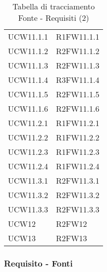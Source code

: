 \begin{table}[!htbp]
\begin{tabular}[t]{ m{}<{\centering}  m{}<{\centering} }
	UCW11.1.1 & R1FW11.1.1 \\
		
	UCW11.1.2 & R2FW11.1.2 \\
		
	UCW11.1.3 & R2FW11.1.3 \\
	
	UCW11.1.4 & R3FW11.1.4\\
	
	UCW11.1.5 & R2FW11.1.5\\
	
	UCW11.1.6 & R2FW11.1.6 \\
	
	UCW11.2.1 & R1FW11.2.1 \\

	UCW11.2.2 & R1FW11.2.2 \\	
	
	UCW11.2.3 & R1FW11.2.3 \\
	
	UCW11.2.4 & R1FW11.2.4 \\
	
	UCW11.3.1 & R2FW11.3.1 \\
	
	UCW11.3.2 & R2FW11.3.2 \\
	
	UCW11.3.3 & R2FW11.3.3 \\

	UCW12 & R2FW12\\

	UCW13 & R2FW13 \\

\end{tabular}
\caption{Tabella di tracciamento Fonte - Requisiti (2)}
\end{table}

\pagebreak

\subsubsection{Requisito - Fonti}

